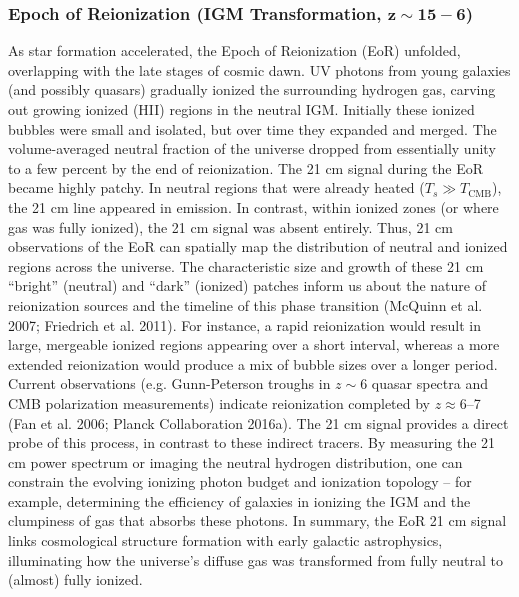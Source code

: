 \documentclass[floats,floatfix,showpacs,amssymb,prd,superscriptaddress,nofootinbib]{revtex4-2} %
\begin{document}
\subsubsection{Epoch of Reionization (IGM Transformation, $\mathbf{z \sim 15-6}$)}
As star formation accelerated, the Epoch of Reionization (EoR) unfolded, overlapping with the late stages of cosmic dawn. UV photons from young galaxies (and possibly quasars) gradually ionized the surrounding hydrogen gas, carving out growing ionized (HII) regions in the neutral IGM. Initially these ionized bubbles were small and isolated, but over time they expanded and merged. The volume-averaged neutral fraction of the universe dropped from essentially unity to a few percent by the end of reionization. The 21 cm signal during the EoR became highly patchy. In neutral regions that were already heated ($T_s \gg T_{\text{CMB}}$), the 21 cm line appeared in emission. In contrast, within ionized zones (or where gas was fully ionized), the 21 cm signal was absent entirely. Thus, 21 cm observations of the EoR can spatially map the distribution of neutral and ionized regions across the universe. The characteristic size and growth of these 21 cm “bright” (neutral) and “dark” (ionized) patches inform us about the nature of reionization sources and the timeline of this phase transition (McQuinn et al. 2007; Friedrich et al. 2011). For instance, a rapid reionization would result in large, mergeable ionized regions appearing over a short interval, whereas a more extended reionization would produce a mix of bubble sizes over a longer period. Current observations (e.g. Gunn-Peterson troughs in $z\sim6$ quasar spectra and CMB polarization measurements) indicate reionization completed by $z\approx6$–7 (Fan et al. 2006; Planck Collaboration 2016a). The 21 cm signal provides a direct probe of this process, in contrast to these indirect tracers. By measuring the 21 cm power spectrum or imaging the neutral hydrogen distribution, one can constrain the evolving ionizing photon budget and ionization topology – for example, determining the efficiency of galaxies in ionizing the IGM and the clumpiness of gas that absorbs these photons. 
In summary, the EoR 21 cm signal links cosmological structure formation with early galactic astrophysics, illuminating how the universe’s diffuse gas was transformed from fully neutral to (almost) fully ionized.
\end{document}
